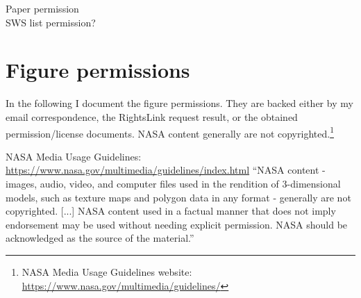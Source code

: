 

Paper permission\\

SWS list permission?\\


\renewcommand\listfigurename{List of Figures and their permissions}
\lofimagetrue
\listoffigures

\section*{Figure permissions}
In the following I document the figure permissions. They are backed either by my email correspondence, the RightsLink request result, or the obtained permission/license documents. NASA content generally are not copyrighted.\footnote{NASA Media Usage Guidelines website: \url{https://www.nasa.gov/multimedia/guidelines/}}

NASA Media Usage Guidelines:\\
\url{https://www.nasa.gov/multimedia/guidelines/index.html}
``NASA content - images, audio, video, and computer files used in the rendition of 3-dimensional models, such as texture maps and polygon data in any format - generally are not copyrighted. [...] NASA content used in a factual manner that does not imply endorsement may be used without needing explicit permission. NASA should be acknowledged as the source of the material.''\\


